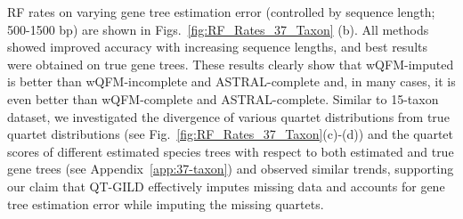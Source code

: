 RF rates on varying gene tree estimation error (controlled by sequence length; 500-1500 bp) are shown in  Figs.~\ref{fig:RF_Rates_37_Taxon} (b). All methods showed improved accuracy with increasing sequence lengths, and best results were obtained on true gene trees. These results clearly show that wQFM-imputed is better than wQFM-incomplete and ASTRAL-complete and, in many cases, it is even better than wQFM-complete and ASTRAL-complete. Similar to 15-taxon dataset, we investigated the divergence of various quartet distributions from true quartet distributions (see Fig.~\ref{fig:RF_Rates_37_Taxon}(c)-(d)) and the quartet scores of different estimated species trees with respect to both estimated and true gene trees (see Appendix~\ref{app:37-taxon}) and observed similar trends, supporting our claim that QT-GILD effectively imputes missing data and accounts for gene tree estimation error while imputing the missing quartets.




